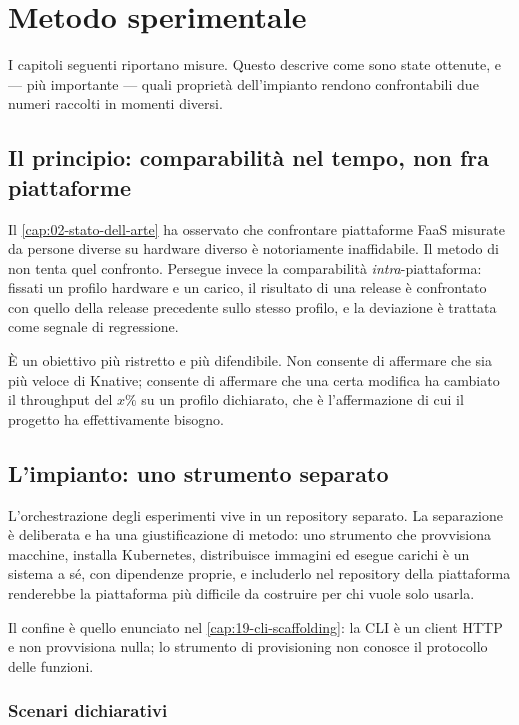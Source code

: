 \chapter{Metodo sperimentale}
\label{cap:22-metodo-sperimentale}

I capitoli seguenti riportano misure. Questo descrive come sono state ottenute,
e --- pi\`u importante --- quali propriet\`a dell'impianto rendono confrontabili
due numeri raccolti in momenti diversi.

\section{Il principio: comparabilit\`a nel tempo, non fra piattaforme}

Il \cref{cap:02-stato-dell-arte} ha osservato che confrontare piattaforme FaaS
misurate da persone diverse su hardware diverso \`e notoriamente inaffidabile.
Il metodo di \nf{} non tenta quel confronto. Persegue invece la comparabilit\`a
\emph{intra}-piattaforma: fissati un profilo hardware e un carico, il risultato
di una release \`e confrontato con quello della release precedente sullo stesso
profilo, e la deviazione \`e trattata come segnale di regressione.

\`E un obiettivo pi\`u ristretto e pi\`u difendibile. Non consente di affermare
che \nf{} sia pi\`u veloce di Knative; consente di affermare che una certa
modifica ha cambiato il throughput del $x\%$ su un profilo dichiarato, che \`e
l'affermazione di cui il progetto ha effettivamente bisogno.

\section{L'impianto: uno strumento separato}

L'orchestrazione degli esperimenti vive in un repository separato. La
separazione \`e deliberata e ha una giustificazione di metodo: uno strumento che
provvisiona macchine, installa Kubernetes, distribuisce immagini ed esegue
carichi \`e un sistema a s\'e, con dipendenze proprie, e includerlo nel
repository della piattaforma renderebbe la piattaforma pi\`u difficile da
costruire per chi vuole solo usarla.

Il confine \`e quello enunciato nel \cref{cap:19-cli-scaffolding}: la CLI \`e un
client HTTP e non provvisiona nulla; lo strumento di provisioning non conosce il
protocollo delle funzioni.

\subsection{Scenari dichiarativi}


